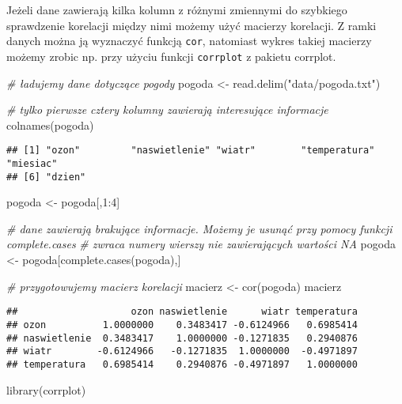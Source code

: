 \documentclass[
]{book}
\newenvironment{Shaded}{\begin{snugshade}}{\end{snugshade}}
\newcommand{\CommentTok}[1]{\textcolor[rgb]{0.56,0.35,0.01}{\textit{#1}}}
\newcommand{\DecValTok}[1]{\textcolor[rgb]{0.00,0.00,0.81}{#1}}
\newcommand{\FunctionTok}[1]{\textcolor[rgb]{0.00,0.00,0.00}{#1}}
\newcommand{\NormalTok}[1]{#1}
\newcommand{\OtherTok}[1]{\textcolor[rgb]{0.56,0.35,0.01}{#1}}
\newcommand{\SpecialCharTok}[1]{\textcolor[rgb]{0.00,0.00,0.00}{#1}}
\newcommand{\StringTok}[1]{\textcolor[rgb]{0.31,0.60,0.02}{#1}}
\begin{document}
Jeżeli dane zawierają kilka kolumn z różnymi zmiennymi do szybkiego sprawdzenie korelacji między nimi możemy użyć macierzy korelacji. Z ramki danych można ją wyznaczyć funkcją \texttt{cor}, natomiast wykres takiej macierzy możemy zrobic np. przy użyciu funkcji \texttt{corrplot} z pakietu corrplot.

\begin{Shaded}
\begin{Highlighting}[]
\CommentTok{\# ładujemy dane dotyczące pogody}
\NormalTok{pogoda }\OtherTok{\textless{}{-}} \FunctionTok{read.delim}\NormalTok{(}\StringTok{"data/pogoda.txt"}\NormalTok{)}

\CommentTok{\# tylko pierwsze cztery kolumny zawierają interesujące informacje}
\FunctionTok{colnames}\NormalTok{(pogoda)}
\end{Highlighting}
\end{Shaded}

\begin{verbatim}
## [1] "ozon"         "naswietlenie" "wiatr"        "temperatura"  "miesiac"     
## [6] "dzien"
\end{verbatim}

\begin{Shaded}
\begin{Highlighting}[]
\NormalTok{pogoda }\OtherTok{\textless{}{-}}\NormalTok{ pogoda[,}\DecValTok{1}\SpecialCharTok{:}\DecValTok{4}\NormalTok{]}

\CommentTok{\# dane zawierają brakujące informacje. Możemy je usunąć przy pomocy funkcji complete.cases}
\CommentTok{\# zwraca numery wierszy nie zawierających wartości NA}
\NormalTok{pogoda }\OtherTok{\textless{}{-}}\NormalTok{ pogoda[}\FunctionTok{complete.cases}\NormalTok{(pogoda),]}

\CommentTok{\# przygotowujemy macierz korelacji}
\NormalTok{macierz }\OtherTok{\textless{}{-}} \FunctionTok{cor}\NormalTok{(pogoda)}
\NormalTok{macierz}
\end{Highlighting}
\end{Shaded}

\begin{verbatim}
##                    ozon naswietlenie      wiatr temperatura
## ozon          1.0000000    0.3483417 -0.6124966   0.6985414
## naswietlenie  0.3483417    1.0000000 -0.1271835   0.2940876
## wiatr        -0.6124966   -0.1271835  1.0000000  -0.4971897
## temperatura   0.6985414    0.2940876 -0.4971897   1.0000000
\end{verbatim}

\begin{Shaded}
\begin{Highlighting}[]
\FunctionTok{library}\NormalTok{(corrplot)}
\end{Highlighting}
\end{Shaded}
\end{document}
